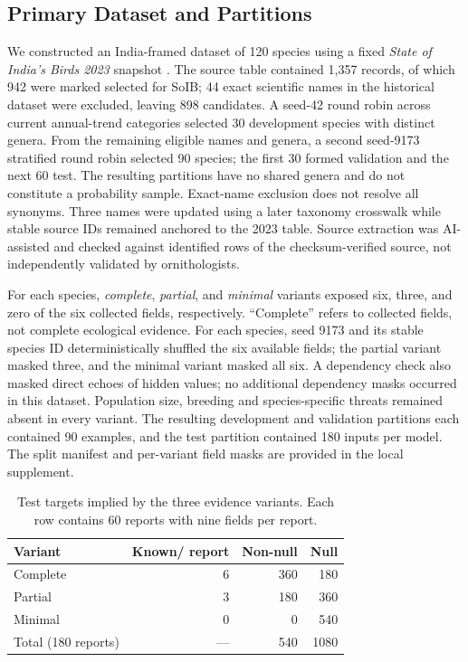\documentclass[a4paper,conference,10pt]{IEEEtran}
\begin{document}
\subsection{Primary Dataset and Partitions}
We constructed an India-framed dataset of 120 species using a fixed \emph{State of India's Birds 2023} snapshot \cite{soib}. The source table contained 1,357 records, of which 942 were marked selected for SoIB; 44 exact scientific names in the historical dataset were excluded, leaving 898 candidates. A seed-42 round robin across current annual-trend categories selected 30 development species with distinct genera. From the remaining eligible names and genera, a second seed-9173 stratified round robin selected 90 species; the first 30 formed validation and the next 60 test. The resulting partitions have no shared genera and do not constitute a probability sample. Exact-name exclusion does not resolve all synonyms. Three names were updated using a later taxonomy crosswalk while stable source IDs remained anchored to the 2023 table. Source extraction was AI-assisted and checked against identified rows of the checksum-verified source, not independently validated by ornithologists.

For each species, \emph{complete}, \emph{partial}, and \emph{minimal} variants exposed six, three, and zero of the six collected fields, respectively. ``Complete'' refers to collected fields, not complete ecological evidence. For each species, seed 9173 and its stable species ID deterministically shuffled the six available fields; the partial variant masked three, and the minimal variant masked all six. A dependency check also masked direct echoes of hidden values; no additional dependency masks occurred in this dataset. Population size, breeding and species-specific threats remained absent in every variant. The resulting development and validation partitions each contained 90 examples, and the test partition contained 180 inputs per model. The split manifest and per-variant field masks are provided in the local supplement.

\begin{table}[t]
\centering
\caption{Test targets implied by the three evidence variants. Each row contains 60 reports with nine fields per report.}
\label{tab:availability}
\footnotesize
\begin{tabularx}{\columnwidth}{@{}>{\raggedright\arraybackslash}Xrrr@{}}
\toprule
\textbf{Variant} & \textbf{Known/ report} & \textbf{Non-null} & \textbf{Null}\\
\midrule
Complete & 6 & 360 & 180\\
Partial & 3 & 180 & 360\\
Minimal & 0 & 0 & 540\\
\midrule
Total (180 reports) & --- & 540 & 1080\\
\bottomrule
\end{tabularx}
\end{table}
\end{document}
